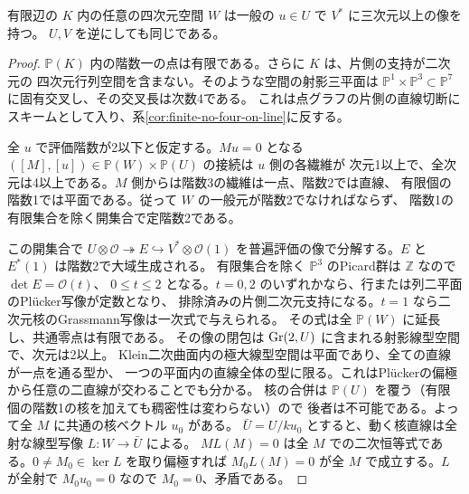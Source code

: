 \begin{lemma}\label{lem:finite-four-forms-evaluate-three}
有限辺の $K$ 内の任意の四次元空間 $W$ は一般の $u\in U$ で $V^*$ に三次元以上の像を持つ。
$U,V$ を逆にしても同じである。
\end{lemma}
\begin{proof}
$\mathbb P(K)$ 内の階数一の点は有限である。さらに $K$ は、片側の支持が二次元の
四次元行列空間を含まない。そのような空間の射影三平面は
$\mathbb P^1\times\mathbb P^3\subset\mathbb P^7$ に固有交叉し、その交叉長は次数4である。
これは点グラフの片側の直線切断にスキームとして入り、系\ref{cor:finite-no-four-on-line}に反する。

全 $u$ で評価階数が2以下と仮定する。$Mu=0$ となる
$([M],[u])\in\mathbb P(W)\times\mathbb P(U)$ の接続は $u$ 側の各繊維が
次元1以上で、全次元は4以上である。$M$ 側からは階数3の繊維は一点、階数2では直線、
有限個の階数1では平面である。従って $W$ の一般元が階数2でなければならず、
階数1の有限集合を除く開集合で定階数2である。

この開集合で $U\otimes\mathcal O\twoheadrightarrow E\hookrightarrow V^*\otimes\mathcal O(1)$
を普遍評価の像で分解する。$E$ と $E^*(1)$ は階数2で大域生成される。
有限集合を除く $\mathbb P^3$ のPicard群は $\mathbb Z$ なので $\det E=\mathcal O(t)$、
$0\le t\le2$ となる。$t=0,2$ のいずれかなら、行または列二平面のPl\"ucker写像が定数となり、
排除済みの片側二次元支持になる。$t=1$ なら二次元核のGrassmann写像は一次式で与えられる。
その式は全 $\mathbb P(W)$ に延長し、共通零点は有限である。
その像の閉包は $\operatorname{Gr}(2,U)$ に含まれる射影線型空間で、次元は2以上。
Klein二次曲面内の極大線型空間は平面であり、全ての直線が一点を通る型か、
一つの平面内の直線全体の型に限る。これはPl\"uckerの偏極から任意の二直線が交わることでも分かる。
核の合併は $\mathbb P(U)$ を覆う（有限個の階数1の核を加えても稠密性は変わらない）ので
後者は不可能である。よって全 $M$ に共通の核ベクトル $u_0$ がある。
$\bar U=U/ku_0$ とすると、動く核直線は全射な線型写像 $L:W\to\bar U$ による。
$M L(M)=0$ は全 $M$ での二次恒等式である。$0\ne M_0\in\ker L$ を取り偏極すれば
$M_0 L(M)=0$ が全 $M$ で成立する。$L$ が全射で $M_0u_0=0$ なので $M_0=0$、矛盾である。
\end{proof}

